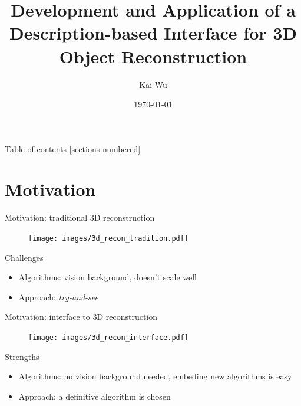 \documentclass[10pt]{beamer}
\title[Interface of 3D Reconstruction]{Development and Application of a Description-based Interface for 3D Object Reconstruction} %
\author{Kai Wu}
\institute[UBC]
{
University of British Columbia \\ %
\medskip
kaywu@ece.ubc.ca \\ %
}
\date{\today}
\begin{document}
\begin{frame}
\maketitle
\end{frame}

\begin{frame}{Table of contents}
  [sections numbered]
  \tableofcontents[hideallsubsections]
\end{frame}


\section{Motivation}
\begin{frame}{Motivation: traditional 3D reconstruction}

\begin{figure}
\centering
\texttt{[image: images/3d\_recon\_tradition.pdf]}
\end{figure}

\begin{alertblock}{Challenges}
  \begin{itemize}
    \item Algorithms: vision background, doesn't scale well
    \item Approach: \textit{try-and-see}
  \end{itemize}
\end{alertblock}

\end{frame}

\begin{frame}{Motivation: interface to 3D reconstruction}

\begin{figure}
\centering
\texttt{[image: images/3d\_recon\_interface.pdf]}
\end{figure}

\begin{exampleblock}{Strengths}
  \begin{itemize}
    \item Algorithms: no vision background needed, embeding new algorithms is easy
    \item Approach: a definitive algorithm is chosen
  \end{itemize}
\end{exampleblock}

\end{frame}
\end{document}
